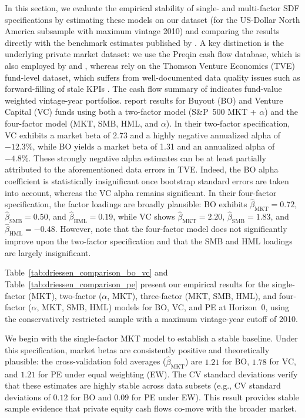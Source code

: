 In this section, we evaluate the empirical stability of single- and multi-factor SDF specifications by estimating these models on our dataset (for the US-Dollar North America subsample with maximum vintage 2010) and comparing the results directly with the benchmark estimates published by \cite{DLP12}.
A key distinction is the underlying private market dataset: we use the Preqin cash flow database, which is also employed by \cite{KN16} and \cite{ACGP18}, whereas \cite{DLP12} rely on the Thomson Venture Economics (TVE) fund-level dataset, which suffers from well-documented data quality issues such as forward-filling of stale KPIs \citep{HJK14}.
The cash flow summary of \cite[Table~3]{DLP12} indicates fund-value weighted vintage-year portfolios.
\cite[Table~5]{DLP12} report results for Buyout (BO) and Venture Capital (VC) funds using both a two-factor model (S\&P~500 MKT + $\alpha$) and the \cite{FF93} four-factor model (MKT, SMB, HML, and $\alpha$).
In their two-factor specification, VC exhibits a market beta of 2.73 and a highly negative annualized alpha of $-12.3\%$, while BO yields a market beta of 1.31 and an annualized alpha of $-4.8\%$.
These strongly negative alpha estimates can be at least partially attributed to the aforementioned data errors in TVE.
Indeed, the BO alpha coefficient is statistically insignificant once bootstrap standard errors are taken into account, whereas the VC alpha remains significant.
In their four-factor specification, the factor loadings are broadly plausible: BO exhibits $\hat{\beta}_{\mathrm{MKT}}=0.72$, $\hat{\beta}_{\mathrm{SMB}}=0.50$, and $\hat{\beta}_{\mathrm{HML}}=0.19$, while VC shows $\hat{\beta}_{\mathrm{MKT}}=2.20$, $\hat{\beta}_{\mathrm{SMB}}=1.83$, and $\hat{\beta}_{\mathrm{HML}}=-0.48$.
However, \cite{DLP12} note that the four-factor model does not significantly improve upon the two-factor specification and that the SMB and HML loadings are largely insignificant.

Table~\ref{tab:driessen_comparison_bo_vc} and Table~\ref{tab:driessen_comparison_pe} present our empirical results for the single-factor (MKT), two-factor ($\alpha$, MKT), three-factor (MKT, SMB, HML), and four-factor ($\alpha$, MKT, SMB, HML) \cite{FF93} models for BO, VC, and PE at Horizon~0, using the conservatively restricted sample with a maximum vintage-year cutoff of 2010.

We begin with the single-factor MKT model to establish a stable baseline.
Under this specification, market betas are consistently positive and theoretically plausible: the cross-validation fold averages ($\hat{\beta}_{\mathrm{MKT}}$) are $1.21$ for BO, $1.78$ for VC, and $1.21$ for PE under equal weighting (EW). 
The CV standard deviations verify that these estimates are highly stable across data subsets (e.g., CV standard deviations of $0.12$ for BO and $0.09$ for PE under EW).
This result provides stable sample evidence that private equity cash flows co-move with the broader market.


